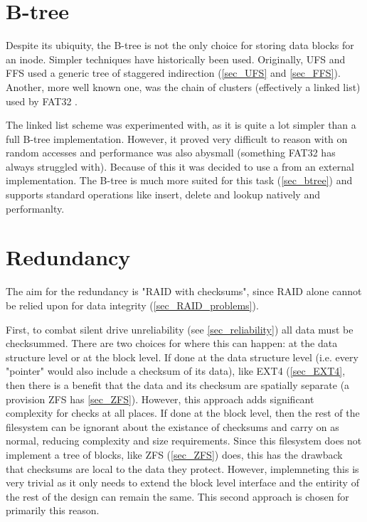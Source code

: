     \section{B-tree}
        \label{sec_design_btree}

        Despite its ubiquity, the B-tree is not the only choice for storing
        data blocks for an inode. Simpler techniques have historically been
        used. Originally, UFS and FFS used a generic tree of staggered
        indirection (\ref{sec_UFS} and \ref{sec_FFS}). Another, more well known
        one, was the chain of clusters (effectively a linked list) used by
        FAT32 \cite{fat32}.

        The linked list scheme was experimented with, as it is quite a lot
        simpler than a full B-tree implementation. However, it proved very
        difficult to reason with on random accesses and performance was also
        abysmall (something FAT32 has always struggled with). Because of this
        it was decided to use a \bplustree from an external implementation. The
        B-tree is much more suited for this task (\ref{sec_btree}) and supports
        standard operations like insert, delete and lookup natively and
        performanlty.

    \section{Redundancy}

        The aim for the redundancy is "RAID with checksums", since RAID alone
        cannot be relied upon for data integrity (\ref{sec_RAID_problems}).

        First, to combat silent drive unreliability (see \ref{sec_reliability})
        all data must be checksummed. There are two choices for where this can
        happen: at the data structure level or at the block level. If done at
        the data structure level (i.e. every "pointer" would also include a
        checksum of its data), like EXT4 (\ref{sec_EXT4}, then there is a
        benefit that the data and its checksum are spatially separate (a
        provision ZFS has \ref{sec_ZFS}). However, this approach adds
        significant complexity for checks at all places. If done at the block
        level, then the rest of the filesystem can be ignorant about the
        existance of checksums and carry on as normal, reducing complexity and
        size requirements. Since this filesystem does not implement a tree of
        blocks, like ZFS (\ref{sec_ZFS}) does, this has the drawback that
        checksums are local to the data they protect. However, implemneting
        this is very trivial as it only needs to extend the block level
        interface and the entirity of the rest of the design can remain the
        same. This second approach is chosen for primarily this reason.

